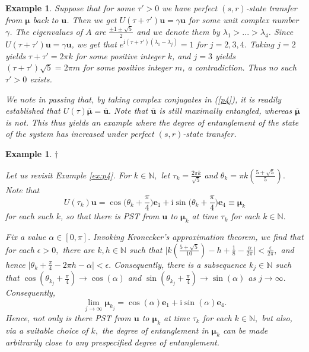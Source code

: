 \documentclass{article}
\numberwithin{equation}{section}
\newtheorem{ex}[lemma]{Example}
\newcommand{\be}{\mathbf e}
\newcommand{\bu}{\mathbf u}
\newcommand{\bmu}{{\boldsymbol{\mu}}}
\def\ii{\mathrm{i}}
\begin{document}
{\begin{ex}
{{Suppose that for some $\tau'>0$ we have perfect $(s,r)$-state transfer from $\bmu$ back to $\bu$. Then we get $U(\tau+\tau')\bu = \gamma \bu$ for some unit complex number $\gamma$.  The eigenvalues of $A$ are $\frac{\pm 1 \pm \sqrt{5}}{2}$ and we denote them by $\lambda_1 > ... > \lambda_4$. Since $U(\tau+\tau')\bu = \gamma \bu$, we get that
$e^{\ii(\tau+\tau')(\lambda_1-\lambda_j)}=1$ for $j=2,3,4$. Taking $j=2$ yields $\tau+\tau' = 2 \pi k$ for some positive integer $k$, and $j=3$ yields  $(\tau+\tau')\sqrt{5} = 2 \pi m$ for some positive integer $m$, a contradiction. Thus no such $\tau'>0$ exists. }}

{\rm{We note in passing that, by taking complex conjugates in (\ref{p4}), it is readily established that $U(\tau) \overline{\bmu}=\overline{\bu}.$ Note that $\overline{\bu}$ is still maximally entangled, whereas $\overline{\bmu}$ is not. This thus yields an example where the degree of entanglement %
of the state of the system has increased under perfect $(s,r)$-state transfer. 
 }}
\end{ex}



\begin{ex}\label{ex:p4'} $\dagger$ \rm{
Let us revisit Example \ref{ex:p4}. For $k \in \mathbb{N},$ let $\tau_k= \frac{2\pi k}{\sqrt{5}}$ and $\theta_k = \pi k\left(\frac{5+\sqrt{5}}{5}\right). $ Note that $$U(\tau_k) \bu = 
    \cos\bigg(\theta_k + \frac{\pi}{4}\bigg)\be_1+\ii\sin\bigg(\theta_k + \frac{\pi}{4}\bigg)\be_4\equiv \bmu_k $$ for each such $k$, so that there is PST from $\bu$ to $\bmu_k$ at time $\tau_k$ for each $k \in \mathbb{N}.$ 

Fix a value $\alpha \in [0,\pi].$ Invoking Kronecker's approximation theorem, we find that for each $\epsilon >0,$ there  are $k, h \in \mathbb{N}$ such that $\Big|k\left(\frac{5+\sqrt{5}}{10}\right) -h + \frac{1}{8}-\frac{\alpha}{2\pi}\Big| < \frac{\epsilon}{2\pi},$ and hence $\Big| \theta_k+\frac{\pi}{4} - 2\pi h -\alpha \Big| < \epsilon.$ Consequently, there is a subsequence $k_j \in \mathbb{N}$ such that $\cos(\theta_{k_j}+\frac{\pi}{4}) \rightarrow \cos(\alpha)$ and  $\sin(\theta_{k_j}+\frac{\pi}{4}) \rightarrow \sin(\alpha)$ as $j \rightarrow \infty.$ Consequently,  $$\lim_{j \rightarrow \infty} \bmu_{k_j} =\cos(\alpha)\be_1+\ii\sin(\alpha)\be_4.$$
Hence, not only is there PST from $\bu$ to $\bmu_k$ at time $\tau_k$ for each $k \in \mathbb{N},$ but also, via a suitable choice of $k,$ the degree of entanglement in $\bmu_k$ can be made arbitrarily close to any prespecified degree of entanglement.}
\end{ex}

}
\end{document}
